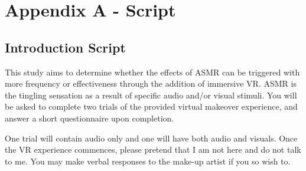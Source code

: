 \documentclass{sigchi}
\begin{document}

%
%
%
%
%
\balance{}

\balance{}




\clearpage
\nobalance
\appendix


\section{Appendix A - Script}
\label{appendix:script}
\subsection{Introduction Script}
This study aims to determine whether the effects of ASMR can be triggered with more frequency or effectiveness through the addition of immersive VR. ASMR is the tingling sensation as a result of specific audio and/or visual stimuli. You will be asked to complete two trials of the provided virtual makeover experience, and answer a short questionnaire upon completion.

One trial will contain audio only and one will have both audio and visuals. Once the VR experience commences, please pretend that I am not here and do not talk to me. You may make verbal responses to the make-up artist if you so wish to.
\end{document}
